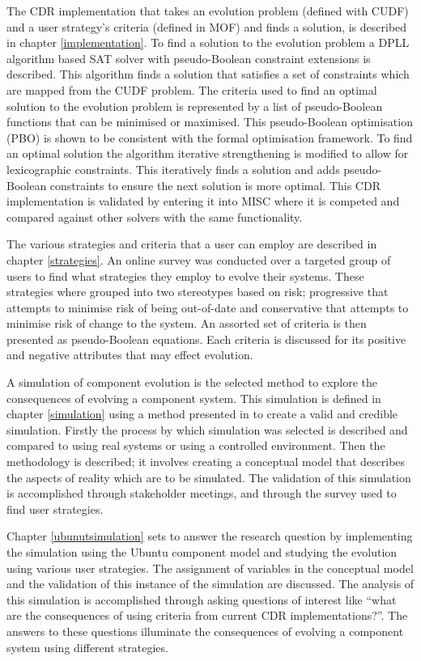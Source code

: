 The CDR implementation that takes an evolution problem (defined with CUDF) and a user strategy's criteria (defined in MOF) and finds a solution, is described in chapter \ref{implementation}.
To find a solution to the evolution problem a DPLL algorithm based SAT solver with pseudo-Boolean constraint extensions is described.
This algorithm finds a solution that satisfies a set of constraints which are mapped from the CUDF problem.
The criteria used to find an optimal solution to the evolution problem is represented by a list of pseudo-Boolean functions that can be minimised or maximised.
This pseudo-Boolean optimisation (PBO) is shown to be consistent with the formal optimisation framework.
To find an optimal solution the algorithm iterative strengthening is modified to allow for lexicographic constraints.
This iteratively finds a solution and adds pseudo-Boolean constraints to ensure the next solution is more optimal.
This CDR implementation is validated by entering it into MISC where it is competed and compared against other solvers with the same functionality.

The various strategies and criteria that a user can employ are described in chapter \ref{strategies}.
An online survey was conducted over a targeted group of users to find what strategies they employ to evolve their systems.
These strategies where grouped into two stereotypes based on risk;
progressive that attempts to minimise risk of being out-of-date
and conservative that attempts to minimise risk of change to the system.
An assorted set of criteria is then presented as pseudo-Boolean equations.
Each criteria is discussed for its positive and negative attributes that may effect evolution.

A simulation of component evolution is the selected method to explore the consequences of evolving a component system.
This simulation is defined in chapter \ref{simulation} using a method presented in \cite{Law2005} to create a valid and credible simulation.
Firstly the process by which simulation was selected is described and compared to using real systems or using a controlled environment.
Then the methodology is described; it involves creating a conceptual model that describes the aspects of reality which are to be simulated.
The validation of this simulation is accomplished through stakeholder meetings, and through the survey used to find user strategies.

Chapter \ref{ubunutsimulation} sets to answer the research question by implementing the simulation using the Ubuntu component model 
and studying the evolution using various user strategies.
The assignment of variables in the conceptual model and the validation of this instance of the simulation are discussed.
The analysis of this simulation is accomplished through asking questions of interest like ``what are the consequences of using criteria from current CDR implementations?''.
The answers to these questions illuminate the consequences of evolving a component system using different strategies.

